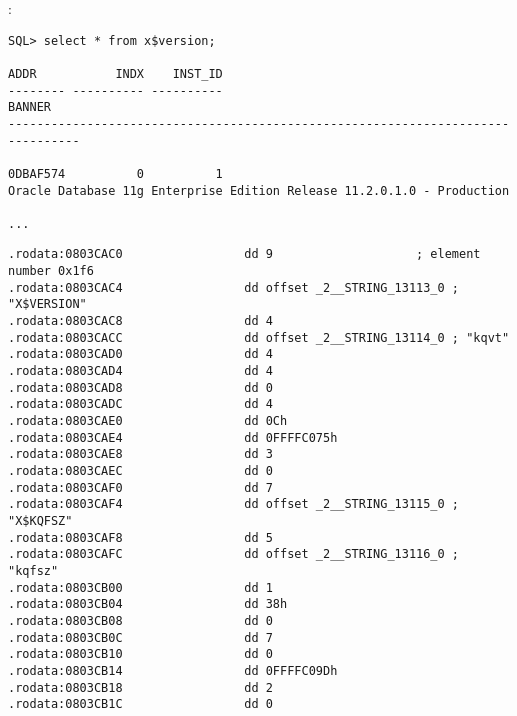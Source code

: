 :

\begin{lstlisting}
SQL> select * from x$version;

ADDR           INDX    INST_ID
-------- ---------- ----------
BANNER
--------------------------------------------------------------------------------

0DBAF574          0          1
Oracle Database 11g Enterprise Edition Release 11.2.0.1.0 - Production

...
\end{lstlisting}



\begin{lstlisting}
.rodata:0803CAC0                 dd 9                    ; element number 0x1f6
.rodata:0803CAC4                 dd offset _2__STRING_13113_0 ; "X$VERSION"
.rodata:0803CAC8                 dd 4
.rodata:0803CACC                 dd offset _2__STRING_13114_0 ; "kqvt"
.rodata:0803CAD0                 dd 4
.rodata:0803CAD4                 dd 4
.rodata:0803CAD8                 dd 0
.rodata:0803CADC                 dd 4
.rodata:0803CAE0                 dd 0Ch
.rodata:0803CAE4                 dd 0FFFFC075h
.rodata:0803CAE8                 dd 3
.rodata:0803CAEC                 dd 0
.rodata:0803CAF0                 dd 7
.rodata:0803CAF4                 dd offset _2__STRING_13115_0 ; "X$KQFSZ"
.rodata:0803CAF8                 dd 5
.rodata:0803CAFC                 dd offset _2__STRING_13116_0 ; "kqfsz"
.rodata:0803CB00                 dd 1
.rodata:0803CB04                 dd 38h
.rodata:0803CB08                 dd 0
.rodata:0803CB0C                 dd 7
.rodata:0803CB10                 dd 0
.rodata:0803CB14                 dd 0FFFFC09Dh
.rodata:0803CB18                 dd 2
.rodata:0803CB1C                 dd 0
\end{lstlisting}

